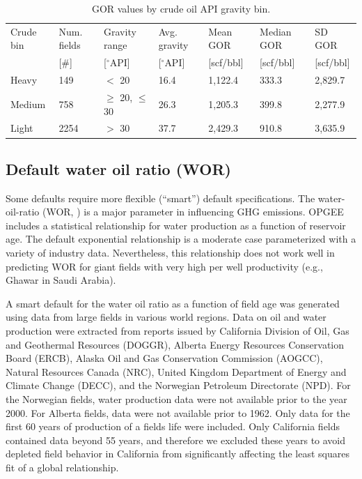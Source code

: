 \documentclass[11pt]{report}
\newcommand{\xlname}[1]{\raisebox{1pt}{\fcolorbox{light-gray}{light-gray}{\texttt{\textcolor{stanford}{\scriptsize{#1}}}}}}
\begin{document}
\begin{table}
\begin{scriptsize}
\caption{GOR values by crude oil API gravity bin.}
\label{tab:GOR_averages}
\begin{tabular*}{1\columnwidth}{p{}p{}p{}p{}p{}p{}p{}}
\toprule
Crude bin & Num. fields & Gravity range & Avg. gravity & Mean GOR & Median GOR & SD GOR \\
& [\#] & [$^\circ$API] & [$^\circ$API] & [scf/bbl] & [scf/bbl] & [scf/bbl] \\
\midrule
Heavy & 149 & $<$ 20 & 16.4 & 1,122.4 & 333.3 & 2,829.7 \\
Medium & 758 & $\geq$ 20, $\leq$ 30 & 26.3 & 1,205.3 & 399.8 & 2,277.9 \\
Light & 2254 & $>$ 30 & 37.7 & 2,429.3 & 910.8 & 3,635.9 \\
\bottomrule
\end{tabular*}
\end{scriptsize}
\end{table}


\subsection{Default water oil ratio (WOR)} \label{WORSmartDefault}

Some defaults require more flexible (``smart'') default specifications. The water-oil-ratio (WOR, \xlname{WOR}) is a major parameter in influencing GHG emissions. OPGEE includes a statistical relationship for water production as a function of reservoir age. The default exponential relationship is a moderate case parameterized with a variety of industry data. Nevertheless, this relationship does not work well in predicting WOR for giant fields with very high per well productivity (e.g., Ghawar in Saudi Arabia).

A smart default for the water oil ratio as a function of field age was generated using data from large fields in various world regions. Data on oil and water production were extracted from reports issued by California Division of Oil, Gas and Geothermal Resources (DOGGR), Alberta Energy Resources Conservation Board (ERCB), Alaska Oil and Gas Conservation Commission (AOGCC), Natural Resources Canada (NRC), United Kingdom Department of Energy and Climate Change (DECC), and the Norwegian Petroleum Directorate (NPD). For the Norwegian fields, water production data were not available prior to the year 2000. For Alberta fields, data were not available prior to 1962. Only data for the first 60 years of production of a fields life were included. Only California fields contained data beyond 55 years, and therefore we excluded these years to avoid depleted field behavior in California from significantly affecting the least squares fit of a global relationship. 
\end{document}
